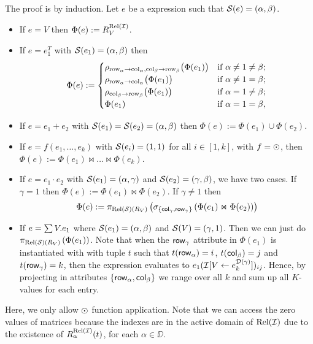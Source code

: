 The proof is by induction. Let $e$ be a \langsum expression such that $\mathcal{S} (e)=(\alpha, \beta)$.
\begin{itemize}
  \item If $e=V$ then $\Phi (e):=R_V^{\text{Rel}(\mathcal{I})}$.

  \item If $e=e_1^T$ with $\mathcal{S} (e_1)=(\alpha, \beta)$ then \[
\Phi(e) :=
\begin{cases}
\rho_{\mathrm{row}_\alpha \to \mathrm{col}_\alpha,\mathrm{col}_\beta \to \mathrm{row}_\beta}\bigl(\Phi(e_1)\bigr) & \text{if } \alpha \neq 1 \neq \beta; \cr
\rho_{\mathrm{row}_\alpha \to \mathrm{col}_\alpha}\bigl(\Phi(e_1)\bigr) & \text{if } \alpha \neq 1 = \beta; \cr
\rho_{\mathrm{col}_\beta \to \mathrm{row}_\beta}\bigl(\Phi(e_1)\bigr) & \text{if } \alpha = 1 \neq \beta; \cr
\Phi(e_1) & \text{if } \alpha = 1 = \beta,
\end{cases}
\]

  \item If $e=e_1+e_2$ with $\mathcal{S} (e_1)=\mathcal{S} (e_2)=(\alpha, \beta)$ then $\Phi (e):=\Phi (e_1)\cup \Phi (e_2)$.

  \item If $e=f(e_1,\ldots, e_k)$ with $\mathcal{S}(e_i)=(1,1)$ for all $i\in[1,k]$, with $f=\odot$, then $\Phi(e):=\Phi(e_1)\Join \ldots \Join\Phi(e_k)$.

  \item If $e=e_1\cdot e_2$ with $\mathcal{S} (e_1)=(\alpha, \gamma)$ and $\mathcal{S} (e_2)=(\gamma, \beta)$, we have two cases. If $\gamma = 1$ then $\Phi (e):=\Phi (e_1)\Join \Phi (e_2)$.
If $\gamma\neq 1$ then
$$
\Phi (e) := \pi_{\text{Rel}(\mathcal{S})(R_V)}\left( \sigma_{\lbrace \mathsf{col}_\gamma, \mathsf{row}_\gamma \rbrace} \left( \Phi (e_1)\Join \Phi (e_2) \right) \right)
$$

  \item If $e=\textstyle\sum V. e_1$ where $\mathcal{S}(e_1)=(\alpha,\beta)$ and $\mathcal{S}(V)=(\gamma,1)$. Then we can just do $\pi_{\text{Rel}(\mathcal{S})(R_V)}\left( \Phi (e_1) \right)$.
Note that when the $\mathsf{row}_\gamma$ attribute in $\Phi (e_1)$ is instantiated with with tuple $t$ such that $t(\mathsf{row}_\alpha)=i$, $t(\mathsf{col}_\beta)=j$ and $t(\mathsf{row}_\gamma)=k$,
then the expression evaluates to $e_1(\mathcal{I} [V\leftarrow e_{k}^{\mathcal{D}(\gamma)}])_{ij}$. 
Hence, by projecting in attributes $\lbrace \mathsf{row}_\alpha, \mathsf{col}_\beta\rbrace$ we range over all $k$ and sum up all $K$-values for each entry.
\end{itemize}

Here, we only allow $\odot$ function application. 
Note that we can access the zero values of matrices because the indexes are in the active domain of $\text{Rel}(\mathcal{I})$ due to the existence of $R_\alpha^{\text{Rel}(\mathcal{I})}(t)$, for each $\alpha \in \DD$.

